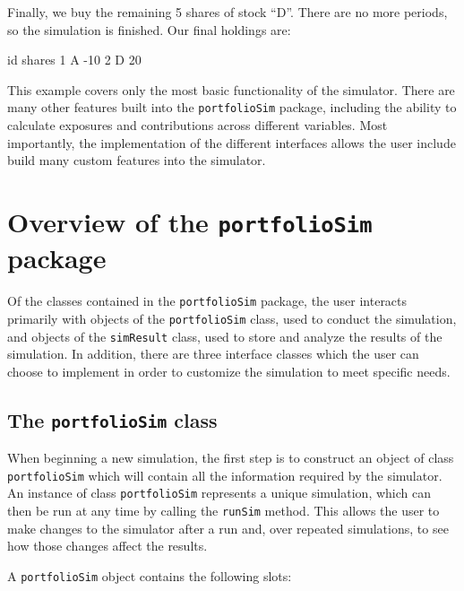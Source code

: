 \documentclass{article}
\begin{document}
Finally, we buy the remaining 5 shares of stock ``D''.  There are no
more periods, so the simulation is finished.  Our final holdings are:

\begin{Schunk}
\begin{Soutput}
  id shares
1  A    -10
2  D     20
\end{Soutput}
\end{Schunk}

This example covers only the most basic functionality of the
simulator.  There are many other features built into the
\texttt{portfolioSim} package, including the ability to calculate
exposures and contributions across different variables.  Most
importantly, the implementation of the different interfaces allows the
user include build many custom features into the simulator.


\section{Overview of the \texttt{portfolioSim} package}

Of the classes contained in the \texttt{portfolioSim} package, the
user interacts primarily with objects of the \texttt{portfolioSim}
class, used to conduct the simulation, and objects of the
\texttt{simResult} class, used to store and analyze the results of the
simulation.  In addition, there are three interface classes which the
user can choose to implement in order to customize the simulation to
meet specific needs.

\subsection{The \texttt{portfolioSim} class}

When beginning a new simulation, the first step is to construct an
object of class \texttt{portfolioSim} which will contain all the
information required by the simulator.  An instance of class
\texttt{portfolioSim} represents a unique simulation, which can then
be run at any time by calling the \texttt{runSim} method.  This allows
the user to make changes to the simulator after a run and, over
repeated simulations, to see how those changes affect the results.

A \texttt{portfolioSim} object contains the following slots:
\end{document}
